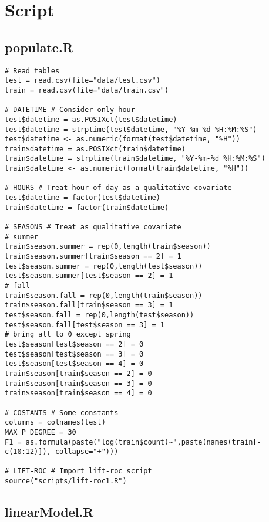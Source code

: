 \section{Script}\label{sec:script}

\subsection{populate.R}\label{sec:script-populate}
\begin{verbatim}
# Read tables
test = read.csv(file="data/test.csv")
train = read.csv(file="data/train.csv")

# DATETIME # Consider only hour
test$datetime = as.POSIXct(test$datetime)
test$datetime = strptime(test$datetime, "%Y-%m-%d %H:%M:%S")
test$datetime <- as.numeric(format(test$datetime, "%H"))
train$datetime = as.POSIXct(train$datetime)
train$datetime = strptime(train$datetime, "%Y-%m-%d %H:%M:%S")
train$datetime <- as.numeric(format(train$datetime, "%H"))

# HOURS # Treat hour of day as a qualitative covariate
test$datetime = factor(test$datetime)
train$datetime = factor(train$datetime)

# SEASONS # Treat as qualitative covariate
# summer
train$season.summer = rep(0,length(train$season))
train$season.summer[train$season == 2] = 1
test$season.summer = rep(0,length(test$season))
test$season.summer[test$season == 2] = 1
# fall
train$season.fall = rep(0,length(train$season))
train$season.fall[train$season == 3] = 1
test$season.fall = rep(0,length(test$season))
test$season.fall[test$season == 3] = 1
# bring all to 0 except spring
test$season[test$season == 2] = 0
test$season[test$season == 3] = 0
test$season[test$season == 4] = 0
train$season[train$season == 2] = 0
train$season[train$season == 3] = 0
train$season[train$season == 4] = 0

# COSTANTS # Some constants
columns = colnames(test)
MAX_P_DEGREE = 30
F1 = as.formula(paste("log(train$count)~",paste(names(train[-c(10:12)]), collapse="+")))

# LIFT-ROC # Import lift-roc script
source("scripts/lift-roc1.R")

\end{verbatim}

\subsection{linearModel.R}\label{sec:script-linear-model}

